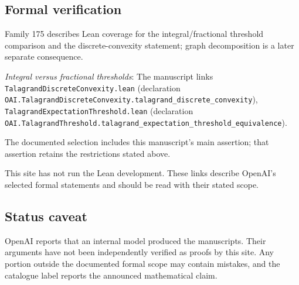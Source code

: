 \documentclass[11pt]{article}
\begin{document}
\subsection{Formal verification}
Family 175 describes Lean coverage for the integral/fractional threshold comparison and the discrete-convexity statement; graph decomposition is a later separate consequence.

\textit{Integral versus fractional thresholds}: The manuscript links \texttt{TalagrandDiscreteConvexity.lean} (declaration \texttt{OAI.TalagrandDiscreteConvexity.talagrand\_discrete\_convexity}), \texttt{TalagrandExpectationThreshold.lean} (declaration \texttt{OAI.TalagrandThreshold.talagrand\_expectation\_threshold\_equivalence}).

The documented selection includes this manuscript’s main assertion; that assertion retains the restrictions stated above.

This site has not run the Lean development. These links describe OpenAI’s selected formal statements and should be read with their stated scope.

\subsection{Status caveat}
OpenAI reports that an internal model produced the manuscripts. Their arguments have not been independently verified as proofs by this site. Any portion outside the documented formal scope may contain mistakes, and the catalogue label reports the announced mathematical claim.
\end{document}
